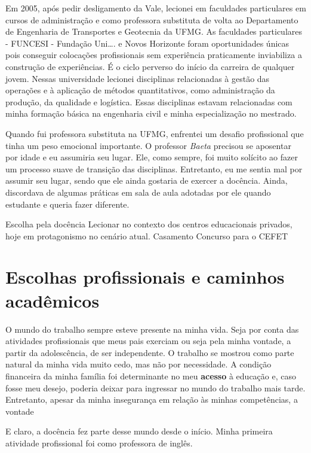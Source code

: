 \documentclass[
]{book}
\begin{document}
Em 2005, após pedir desligamento da Vale, lecionei em faculdades
particulares em cursos de administração e como professora substituta de
volta ao Departamento de Engenharia de Transportes e Geotecnia da UFMG.
As faculdades particulares - FUNCESI - Fundação Uni\ldots. e Novos
Horizonte foram oportunidades únicas pois conseguir colocações
profissionais sem experiência praticamente inviabiliza a construção de
experiências. É o ciclo perverso do início da carreira de qualquer
jovem. Nessas universidade lecionei disciplinas relacionadas à gestão
das operações e à aplicação de métodos quantitativos, como administração
da produção, da qualidade e logística. Essas disciplinas estavam
relacionadas com minha formação básica na engenharia civil e minha
especialização no mestrado.

Quando fui professora substituta na UFMG, enfrentei um desafio
profissional que tinha um peso emocional importante. O professor
\emph{Baeta} precisou se aposentar por idade e eu assumiria seu lugar.
Ele, como sempre, foi muito solícito ao fazer um processo suave de
transição das disciplinas. Entretanto, eu me sentia mal por assumir seu
lugar, sendo que ele ainda gostaria de exercer a docência. Ainda,
discordava de algumas práticas em sala de aula adotadas por ele quando
estudante e queria fazer diferente.

Escolha pela docência Lecionar no contexto dos centros educacionais
privados, hoje em protagonismo no cenário atual. Casamento Concurso para
o CEFET

\hypertarget{escolhas-profissionais-e-caminhos-acaduxeamicos}{%
\chapter{Escolhas profissionais e caminhos
acadêmicos}\label{escolhas-profissionais-e-caminhos-acaduxeamicos}}

O mundo do trabalho sempre esteve presente na minha vida. Seja por conta
das atividades profissionais que meus pais exerciam ou seja pela minha
vontade, a partir da adolescência, de ser independente. O trabalho se
mostrou como parte natural da minha vida muito cedo, mas não por
necessidade. A condição financeira da minha família foi determinante no
meu \textbf{acesso} à educação e, caso fosse meu desejo, poderia deixar
para ingressar no mundo do trabalho mais tarde. Entretanto, apesar da
minha insegurança em relação às minhas competências, a vontade

E claro, a docência fez parte desse mundo desde o início. Minha primeira
atividade profissional foi como professora de inglês.
\end{document}
